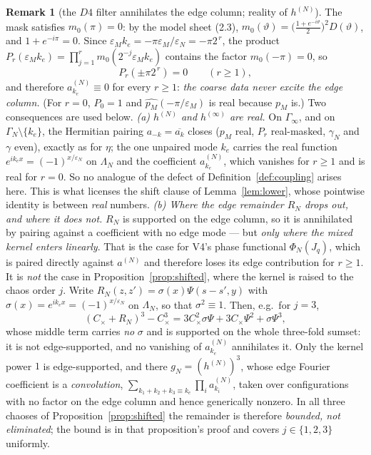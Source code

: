 \documentclass[11pt,a4paper]{article}
\theoremstyle{plain}
\theoremstyle{definition}
\newtheorem*{remarknn}{Remark}
\newcommand{\eps}{\varepsilon}
\begin{document}
\begin{remarknn}[the $D4$ filter annihilates the edge column; reality of $h^{(N)}$]
The mask satisfies $m_0(\pi)=0$: by the model sheet (2.3),
$m_0(\vartheta)=\bigl(\tfrac{1+e^{-i\vartheta}}2\bigr)^2D(\vartheta)$, and
$1+e^{-i\pi}=0$. Since $\eps_Mk_e=-\pi\eps_M/\eps_N=-\pi2^{\,r}$, the product
$P_r(\eps_Mk_e)=\prod_{j=1}^rm_0(2^{-j}\eps_Mk_e)$ contains the factor
$m_0(-\pi)=0$, so
\[
 P_r(\pm\pi2^{\,r})=0\qquad(r\ge1),
\]
and therefore $a^{(N)}_{k_e}\equiv0$ for every $r\ge1$: \emph{the coarse data never
excite the edge column.} (For $r=0$, $P_0=1$ and $\widehat{p_M}(-\pi/\eps_M)$ is real
because $p_M$ is.) Two consequences are used below.
\emph{(a) $h^{(N)}$ and $h^{(\infty)}$ are real.} On $\Gamma_\infty$, and on
$\Gamma_N\setminus\{k_e\}$, the Hermitian pairing $a_{-k}=\overline{a_k}$ closes
($p_M$ real, $P_r$ real-masked, $\gamma_N$ and $\gamma$ even), exactly as for
$\eta$; the one unpaired mode $k_e$ carries the real function
$e^{ik_ex}=(-1)^{x/\eps_N}$ on $\Lambda_N$ and the coefficient $a^{(N)}_{k_e}$, which
vanishes for $r\ge1$ and is real for $r=0$. So no analogue of the defect of
Definition~\ref{def:coupling} arises here. This is what licenses the shift clause of
Lemma~\ref{lem:lower}, whose pointwise identity is between \emph{real} numbers.
\emph{(b) Where the edge remainder $R_N$ drops out, and where it does not.} $R_N$ is
supported on the edge column, so it is annihilated by pairing against a coefficient with
no edge mode --- but \emph{only where the mixed kernel enters linearly}. That is the case
for V4's phase functional $\Phi_N(J_q)$, which is paired directly against $a^{(N)}$ and
therefore loses its edge contribution for $r\ge1$. It is \emph{not} the case in
Proposition~\ref{prop:shifted}, where the kernel is raised to the chaos order $j$. Write
$R_N(z,z')=\sigma(x)\Psi(s-s',y)$ with $\sigma(x)=e^{ik_ex}=(-1)^{x/\eps_N}$ on
$\Lambda_N$, so that $\sigma^2\equiv1$. Then, e.g.\ for $j=3$,
\[
 (C_\times+R_N)^3-C_\times^3
 =3C_\times^2\sigma\Psi+3C_\times\Psi^2+\sigma\Psi^3 ,
\]
whose middle term carries \emph{no} $\sigma$ and is supported on the whole
three-fold sumset: it is not edge-supported, and no vanishing of $a^{(N)}_{k_e}$
annihilates it.
Only the kernel power $1$ is edge-supported, and there $g_N=(h^{(N)})^3$, whose
edge Fourier coefficient is a \emph{convolution},
$\sum_{k_1+k_2+k_3\equiv k_e}\prod_ia^{(N)}_{k_i}$, taken over configurations with
no factor on the edge column and hence generically nonzero. In all three chaoses of
Proposition~\ref{prop:shifted} the remainder is therefore \emph{bounded, not
eliminated}; the bound is in that proposition's proof and covers $j\in\{1,2,3\}$
uniformly.
\end{remarknn}
\end{document}
